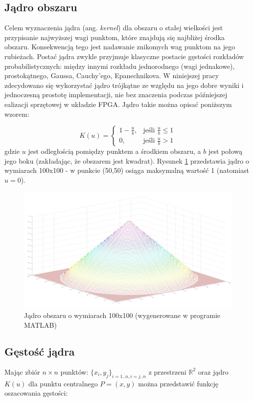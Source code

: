 \subsection{Jądro obszaru}
Celem wyznaczenia jądra (ang. \textit{kernel}) dla obszaru o stałej wielkości jest przypisanie najwyższej wagi punktom, które znajdują się najbliżej środka obszaru. Konsekwencją tego jest nadawanie znikomych wag punktom na jego rubieżach. Postać jądra zwykle przyjmuje klasyczne postacie gęstości rozkładów probabilistycznych: między innymi rozkładu jednorodnego (wagi jednakowe), prostokątnego, Gaussa, Cauchy'ego, Epanechnikova. W niniejszej pracy zdecydowano się wykorzystać jądro trójkątne ze względu na jego dobre wyniki i jednoczesną prostotę implementacji, nie bez znaczenia podczas późniejszej ealizacji sprzętowej w układzie FPGA. Jądro takie można opisać poniższym wzorem:

\begin{equation}
\label{eq:ms3}
K(u)=\begin{cases}
1-\frac{u}{b}, & \text{jeśli }\frac{u}{b}\leq 1 \\
0, & \text{jeśli }\frac{u}{b} > 1
\end{cases}
\end{equation}
gdzie $u$ jest odległością pomiędzy punktem a środkiem obszaru, a $b$ jest połową jego boku (zakładając, że obszarem jest kwadrat). Rysunek \ref{fig:kernel} przedstawia jądro o wymiarach 100x100 - w punkcie (50,50) osiąga maksymalną wartość 1 (natomiast $u=0$).
\begin{figure}[h]
	\centering
	\includegraphics[width=16cm]{3_kernel.jpg}
	\caption{Jądro obszaru o wymiarach 100x100 (wygenerowane w programie MATLAB)}
	\label{fig:kernel}
\end{figure}

\subsection{Gęstość jądra}
Mając zbiór $n\times n$ punktów: $\{x_{i},y_{j}\}_{i=1..n,i=j..n}$ z przestrzeni $\mathbb{R}^2$ oraz jądro $K(u)$ dla punktu centralnego $P=(x,y)$ można przedstawić funkcję oszacowania gęstości:

